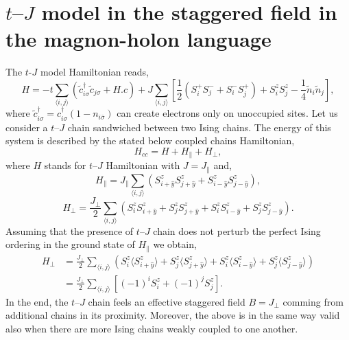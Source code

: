 \documentclass[%
 reprint,
 amsmath,amssymb,
 aps, onecolumn,
prl,
]{revtex4-1}
\newcommand{\mean}[1]{\langle#1\rangle}
\begin{document}
\section{$t$--$J$ model in the staggered field in the magnon-holon language}
The $t$-$J$ model Hamiltonian reads,
\begin{equation}
	H = -t\sum_{\mean{i,j}}\left(\tilde{c}_{i\sigma}^\dagger\tilde{c}_{j\sigma} + H.c\right)
	+ J\sum_{\mean{i,j}}\left[\frac{1}{2}\left(S_i^+S_j^- + S_i^-S_j^+\right) + S_i^zS_j^z - \frac{1}{4}\tilde{n}_i\tilde{n}_j\right],
\end{equation}
where $\tilde{c}_{i\sigma}^\dagger = c_{i\sigma}^\dagger(1-n_{i\bar{\sigma}})$ can create electrons only on unoccupied sites. Let us consider a $t$--$J$ chain sandwiched between two Ising chains. The energy of this system is described by the stated below coupled chains Hamiltonian,
\begin{equation}
	H_{cc} = H + H_\parallel + H_\perp,
\end{equation}
where $H$ stands for $t$--$J$ Hamiltonian with $J = J_\parallel$ and,
\begin{equation}
	H_\parallel = J_\parallel \sum_{\mean{i,j}} \left( S_{i+\hat{y}}^z S_{j+\hat{y}}^z + S_{i-\hat{y}}^zS_{j-\hat{y}}^z \right),
\end{equation}
\begin{equation}
	H_\perp = \frac{J_\perp}{2} \sum_{\mean{i,j}} \left( S_{i}^z S_{i+\hat{y}}^z + S_{j}^z S_{j+\hat{y}}^z + S_{i}^z S_{i-\hat{y}}^z + S_{j}^z S_{j-\hat{y}}^z \right).
\end{equation}
Assuming that the presence of $t$--$J$ chain does not perturb the perfect Ising ordering in the ground state of $H_\parallel$ we obtain,
\begin{align}
	H_\perp 
	&= \frac{J_\perp}{2} \sum_{\mean{i,j}} \left( S_{i}^z \mean{S_{i+\hat{y}}^z} + S_{j}^z \mean{S_{j+\hat{y}}^z} + S_{i}^z \mean{S_{i-\hat{y}}^z} + S_{j}^z \mean{S_{j-\hat{y}}^z} \right) \\
	&= \frac{J_\perp}{2} \sum_{\mean{i,j}} \left[(-1)^i S_{i}^z + (-1)^j S_{j}^z \right].
\end{align}
In the end, the $t$--$J$ chain feels an effective staggered field $B = J_\perp$ comming from additional chains in its proximity. Moreover, the above is in the same way valid also when there are more Ising chains weakly coupled to one another.
\end{document}
